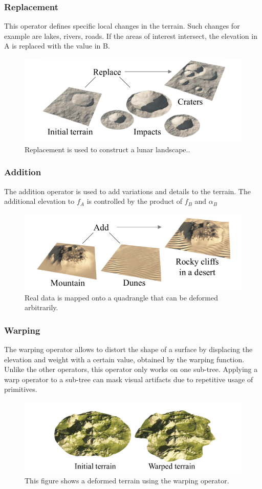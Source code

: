 \subsubsection{Replacement}
This operator defines specific local changes in the terrain. Such changes for example are lakes, rivers, roads. If the areas of interest intersect, the elevation in A is replaced with the value in B. 
\begin{figure}[htb]
	\centering
	\includegraphics[width=.8\linewidth]{GGP15/replace_operator}
	\caption{Replacement is used to construct a lunar landscape..}
	\label{fig:replace_operator}
\end{figure}
\subsubsection{Addition}
The addition operator is used to add variations and details to the terrain. The additional elevation to $f_A$ is controlled by the product of $f_B$ and $\alpha_B$
\begin{figure}[htb]
	\centering
	\includegraphics[width=.8\linewidth]{GGP15/addition_operator}
	\caption{Real data is mapped onto a quadrangle that can be deformed arbitrarily.}
	\label{fig:addition_operator}
\end{figure}
\subsubsection{Warping}
The warping operator allows to distort the shape of a surface by displacing the elevation and weight with a certain value, obtained by the warping function. Unlike the other operators, this operator only works on one sub-tree. 
Applying a warp operator to a sub-tree can mask visual artifacts due to repetitive usage of primitives. 
\begin{figure}[htb]
	\centering
	\includegraphics[width=.8\linewidth]{GGP15/warp_operator}
	\caption{This figure shows a deformed terrain using the warping operator.}
	\label{fig:warp_operator}
\end{figure}
